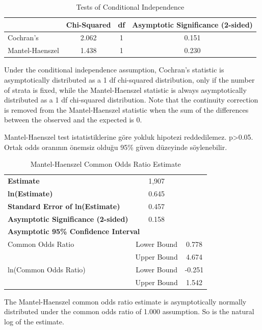 \documentclass{article}
\begin{document}
\begin{table}[htbp]
\centering
\caption{Tests of Conditional Independence}
\label{tab:conditional-independence-tests}
\begin{tabular}{lccc}
\hline
 & \textbf{Chi-Squared} & \textbf{df} & \textbf{Asymptotic Significance (2-sided)} \\
\hline
Cochran's & 2.062 & 1 & 0.151 \\
Mantel-Haenszel & 1.438 & 1 & 0.230 \\
\hline
\end{tabular}
\end{table}

Under the conditional independence assumption, Cochran's statistic is asymptotically distributed as a 1 df chi-squared distribution, only if the number of strata is fixed, while the Mantel-Haenszel statistic is always asymptotically distributed as a 1 df chi-squared distribution. Note that the continuity correction is removed from the Mantel-Haenszel statistic when the sum of the differences between the observed and the expected is 0.

\vspace{20pt}
Mantel-Haenszel test istatistiklerine göre yokluk hipotezi reddedilemez. p>0.05. Ortak odds oranının önemsiz olduğu 95\% güven düzeyinde söylenebilir. 

\vspace{20pt}
\begin{table}[htbp]
\centering
\caption{Mantel-Haenszel Common Odds Ratio Estimate}
\label{tab:mantel-haenszel-estimate}
\begin{tabular}{lcc}
\hline
\textbf{Estimate} & 1,907 \\
\textbf{ln(Estimate)} & 0.645 \\
\textbf{Standard Error of ln(Estimate)} & 0.457 \\
\textbf{Asymptotic Significance (2-sided)} & 0.158 \\
\hline
\multicolumn{3}{l}{\textbf{Asymptotic 95\% Confidence Interval}} \\
Common Odds Ratio & Lower Bound & 0.778 \\
 & Upper Bound & 4.674 \\
ln(Common Odds Ratio) & Lower Bound & -0.251 \\
 & Upper Bound & 1.542 \\
\hline
\end{tabular}
\end{table}

The Mantel-Haenszel common odds ratio estimate is asymptotically normally distributed under the common odds ratio of 1.000 assumption. So is the natural log of the estimate.
\end{document}
